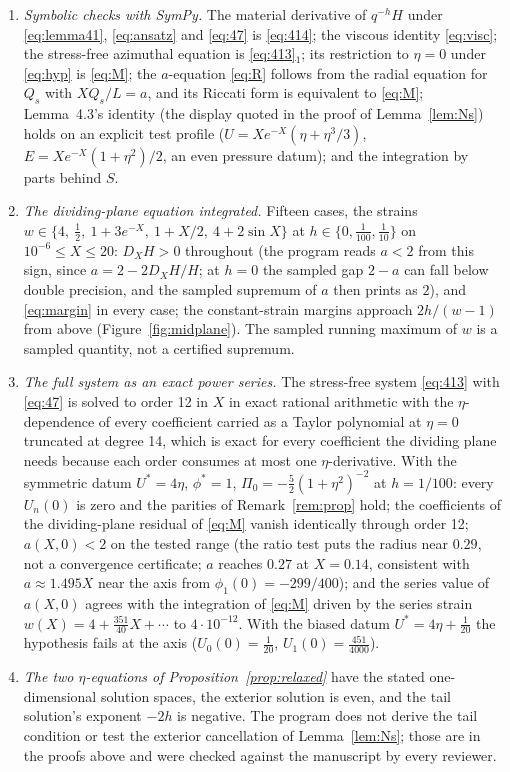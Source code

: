 \documentclass[11pt]{article}
\newcommand{\DX}{D_X}
\newcommand{\Qs}{Q_s}
\begin{document}
\begin{enumerate}
\item \emph{Symbolic checks with SymPy.} The material derivative of $q^{-h}H$ under \eqref{eq:lemma41}, \eqref{eq:ansatz} and \eqref{eq:47} is \eqref{eq:414}; the viscous identity \eqref{eq:visc}; the stress-free azimuthal equation is \eqref{eq:413}$_1$; its restriction to $\eta=0$ under \eqref{eq:hyp} is \eqref{eq:M}; the $a$-equation \eqref{eq:R} follows from the radial equation for $\Qs$ with $X\Qs/L=a$, and its Riccati form is equivalent to \eqref{eq:M}; Lemma~4.3's identity (the display quoted in the proof of Lemma~\ref{lem:Ns}) holds on an explicit test profile ($U=Xe^{-X}(\eta+\eta^3/3)$, $E=Xe^{-X}(1+\eta^2)/2$, an even pressure datum); and the integration by parts behind $S$.
\item \emph{The dividing-plane equation integrated.} Fifteen cases, the strains $w\in\{4,\ \tfrac12,\ 1+3e^{-X},\ 1+X/2,\ 4+2\sin X\}$ at $h\in\{0,\tfrac1{100},\tfrac1{10}\}$ on $10^{-6}\le X\le20$: $\DX H>0$ throughout (the program reads $a<2$ from this sign, since $a=2-2\DX H/H$; at $h=0$ the sampled gap $2-a$ can fall below double precision, and the sampled supremum of $a$ then prints as $2$), and \eqref{eq:margin} in every case; the constant-strain margins approach $2h/(w-1)$ from above (Figure~\ref{fig:midplane}). The sampled running maximum of $w$ is a sampled quantity, not a certified supremum.
\item \emph{The full system as an exact power series.} The stress-free system \eqref{eq:413} with \eqref{eq:47} is solved to order 12 in $X$ in exact rational arithmetic with the $\eta$-dependence of every coefficient carried as a Taylor polynomial at $\eta=0$ truncated at degree 14, which is exact for every coefficient the dividing plane needs because each order consumes at most one $\eta$-derivative. With the symmetric datum $U^*=4\eta$, $\phi^*=1$, $\Pi_0=-\tfrac52(1+\eta^2)^{-2}$ at $h=1/100$: every $U_n(0)$ is zero and the parities of Remark~\ref{rem:prop} hold; the coefficients of the dividing-plane residual of \eqref{eq:M} vanish identically through order 12; $a(X,0)<2$ on the tested range (the ratio test puts the radius near $0.29$, not a convergence certificate; $a$ reaches $0.27$ at $X=0.14$, consistent with $a\approx1.495X$ near the axis from $\phi_1(0)=-299/400$); and the series value of $a(X,0)$ agrees with the integration of \eqref{eq:M} driven by the series strain $w(X)=4+\tfrac{351}{40}X+\cdots$ to $4\cdot10^{-12}$. With the biased datum $U^*=4\eta+\tfrac1{20}$ the hypothesis fails at the axis ($U_0(0)=\tfrac1{20}$, $U_1(0)=\tfrac{451}{4000}$).
\item \emph{The two $\eta$-equations of Proposition~\ref{prop:relaxed}} have the stated one-dimensional solution spaces, the exterior solution is even, and the tail solution's exponent $-2h$ is negative. The program does not derive the tail condition or test the exterior cancellation of Lemma~\ref{lem:Ns}; those are in the proofs above and were checked against the manuscript by every reviewer.
\end{enumerate}
\end{document}
